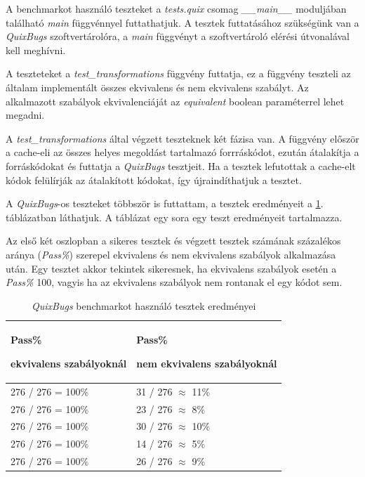 A benchmarkot használó teszteket a \emph{tests.quix} csomag \emph{\_\_main\_\_} moduljában található
\emph{main} függvénnyel futtathatjuk.
A tesztek futtatásához szükségünk van a \emph{QuixBugs} szoftvertárolóra, %
a \emph{main} függvényt a szoftvertároló elérési útvonalával kell meghívni.

A teszteteket a \emph{test\_transformations} függvény futtatja,
ez a függvény teszteli az általam implementált összes ekvivalens és nem ekvivalens szabályt.
Az alkalmazott szabályok ekvivalenciáját az \emph{equivalent} boolean paraméterrel lehet megadni.

A \emph{test\_transformations} által végzett teszteknek két fázisa van.
A függvény először a cache-eli az összes helyes megoldást tartalmazó forrráskódot,
ezután átalakítja a forráskódokat és futtatja a \emph{QuixBugs} tesztjeit.
Ha a tesztek lefutottak a cache-elt kódok felülírják az átalakított kódokat,
így újraindíthatjuk a tesztet.

A \emph{QuixBugs}-os teszteket többször is futtattam,
a tesztek eredményeit a \ref{tab:quix_tests}. táblázatban láthatjuk.
A táblázat egy sora egy teszt eredményeit tartalmazza.

Az első két oszlopban a sikeres tesztek és végzett tesztek számának százalékos aránya (\emph{Pass\%})
szerepel ekvivalens és nem ekvivalens szabályok alkalmazása után.
Egy tesztet akkor tekintek sikeresnek, ha ekvivalens szabályok esetén a \emph{Pass\%} 100,
vagyis ha az ekvivalens szabályok nem rontanak el egy kódot sem.

\begin{table}[H]
	\centering
	\begin{tabular}{ | m{} | m{} | }
		\hline
		\textbf{Pass\%}
		
		\textbf{ekvivalens szabályoknál}
		&
		\textbf{Pass\%}
		
		\textbf{nem ekvivalens szabályoknál}
		\\
		\hline \hline
		276 / 276 = 100\% & 31 / 276 $\approx$ 11\% \\
		\hline
		276 / 276 = 100\% & 23 / 276 $\approx$ 8\% \\
		\hline
		276 / 276 = 100\% & 30 / 276 $\approx$ 10\% \\
		\hline
		276 / 276 = 100\% & 14 / 276 $\approx$ 5\% \\
		\hline
		276 / 276 = 100\% & 26 / 276 $\approx$ 9\% \\
		\hline
	\end{tabular}
	\caption{\emph{QuixBugs} benchmarkot használó tesztek eredményei}
	\label{tab:quix_tests}
\end{table}

